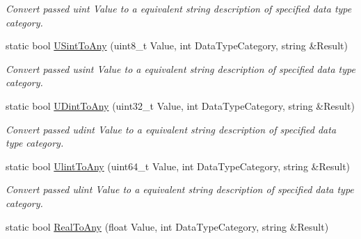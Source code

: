\begin{DoxyCompactItemize}
\begin{DoxyCompactList}\small\item\em Convert passed uint Value to a equivalent string description of specified data type category. \end{DoxyCompactList}\item 
static bool \hyperlink{classpc__emulator_1_1DataTypeUtils_a045630f4aa8a7fb18d08092321a8af8f}{U\+Sint\+To\+Any} (uint8\+\_\+t Value, int Data\+Type\+Category, string \&Result)\hypertarget{classpc__emulator_1_1DataTypeUtils_a045630f4aa8a7fb18d08092321a8af8f}{}\label{classpc__emulator_1_1DataTypeUtils_a045630f4aa8a7fb18d08092321a8af8f}

\begin{DoxyCompactList}\small\item\em Convert passed usint Value to a equivalent string description of specified data type category. \end{DoxyCompactList}\item 
static bool \hyperlink{classpc__emulator_1_1DataTypeUtils_aa33fffc63ceb8433d12ccd4880f2f56c}{U\+Dint\+To\+Any} (uint32\+\_\+t Value, int Data\+Type\+Category, string \&Result)\hypertarget{classpc__emulator_1_1DataTypeUtils_aa33fffc63ceb8433d12ccd4880f2f56c}{}\label{classpc__emulator_1_1DataTypeUtils_aa33fffc63ceb8433d12ccd4880f2f56c}

\begin{DoxyCompactList}\small\item\em Convert passed udint Value to a equivalent string description of specified data type category. \end{DoxyCompactList}\item 
static bool \hyperlink{classpc__emulator_1_1DataTypeUtils_a1c58bda1f1704afe30da939e02791f56}{Ulint\+To\+Any} (uint64\+\_\+t Value, int Data\+Type\+Category, string \&Result)\hypertarget{classpc__emulator_1_1DataTypeUtils_a1c58bda1f1704afe30da939e02791f56}{}\label{classpc__emulator_1_1DataTypeUtils_a1c58bda1f1704afe30da939e02791f56}

\begin{DoxyCompactList}\small\item\em Convert passed ulint Value to a equivalent string description of specified data type category. \end{DoxyCompactList}\item 
static bool \hyperlink{classpc__emulator_1_1DataTypeUtils_ad67f9a13f0eb789577b9f3c5561c4e55}{Real\+To\+Any} (float Value, int Data\+Type\+Category, string \&Result)\hypertarget{classpc__emulator_1_1DataTypeUtils_ad67f9a13f0eb789577b9f3c5561c4e55}{}\label{classpc__emulator_1_1DataTypeUtils_ad67f9a13f0eb789577b9f3c5561c4e55}


\end{DoxyCompactItemize}
